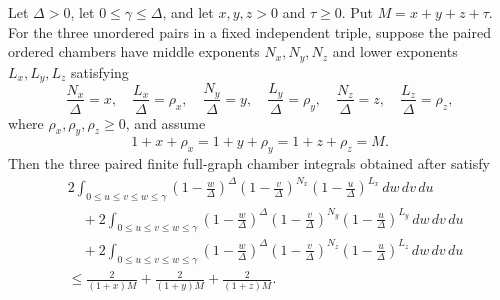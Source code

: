 \begin{helper}
Let $\Delta>0$, let $0\le\gamma\le\Delta$, and let
$x,y,z>0$ and $\tau\ge0$.  Put $M=x+y+z+\tau$.  For the three unordered
pairs in a fixed independent triple, suppose the paired ordered chambers have
middle exponents $N_x,N_y,N_z$ and lower exponents
$L_x,L_y,L_z$ satisfying
\[
\frac{N_x}{\Delta}=x,\quad \frac{L_x}{\Delta}=\rho_x,\quad
\frac{N_y}{\Delta}=y,\quad \frac{L_y}{\Delta}=\rho_y,\quad
\frac{N_z}{\Delta}=z,\quad \frac{L_z}{\Delta}=\rho_z,
\]
where $\rho_x,\rho_y,\rho_z\ge0$, and assume
\[
1+x+\rho_x=1+y+\rho_y=1+z+\rho_z=M .
\]
Then the three paired finite full-graph chamber integrals obtained after
 satisfy
\[
\begin{aligned}
&2\int_{0\le u\le v\le w\le\gamma}
\left(1-\frac w\Delta\right)^\Delta
\left(1-\frac v\Delta\right)^{N_x}
\left(1-\frac u\Delta\right)^{L_x}\,dw\,dv\,du \\
&\quad+
2\int_{0\le u\le v\le w\le\gamma}
\left(1-\frac w\Delta\right)^\Delta
\left(1-\frac v\Delta\right)^{N_y}
\left(1-\frac u\Delta\right)^{L_y}\,dw\,dv\,du \\
&\quad+
2\int_{0\le u\le v\le w\le\gamma}
\left(1-\frac w\Delta\right)^\Delta
\left(1-\frac v\Delta\right)^{N_z}
\left(1-\frac u\Delta\right)^{L_z}\,dw\,dv\,du \\
&\le
\frac{2}{(1+x)M}+\frac{2}{(1+y)M}+\frac{2}{(1+z)M}.
\end{aligned}
\]
\end{helper}
